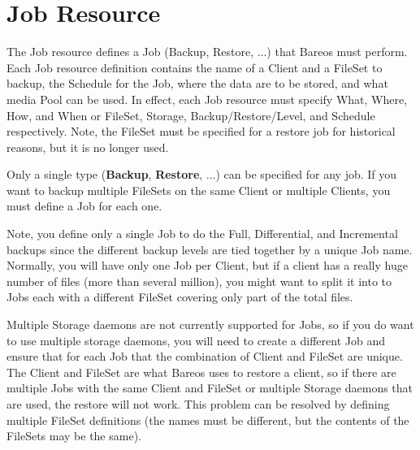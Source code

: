 \section{Job Resource}
\label{JobResource}

The Job resource defines a Job (Backup, Restore, ...) that Bareos must
perform. Each Job resource definition contains the name of a Client and
a FileSet to backup, the Schedule for the Job, where the data
are to be stored, and what media Pool can be used. In effect, each Job
resource must specify What, Where, How, and When or FileSet, Storage,
Backup/Restore/Level, and Schedule respectively. Note, the FileSet must
be specified for a restore job for historical reasons, but it is no longer used.

Only a single type ({\bf Backup}, {\bf Restore}, ...) can be specified for any
job. If you want to backup multiple FileSets on the same Client or multiple
Clients, you must define a Job for each one.

Note, you define only a single Job to do the Full, Differential, and
Incremental backups since the different backup levels are tied together by
a unique Job name.  Normally, you will have only one Job per Client, but
if a client has a really huge number of files (more than several million),
you might want to split it into to Jobs each with a different FileSet
covering only part of the total files.

Multiple Storage daemons are not currently supported for Jobs, so if
you do want to use multiple storage daemons, you will need to create
a different Job and ensure that for each Job that the combination of
Client and FileSet are unique.  The Client and FileSet are what Bareos
uses to restore a client, so if there are multiple Jobs with the same
Client and FileSet or multiple Storage daemons that are used, the
restore will not work.  This problem can be resolved by defining multiple
FileSet definitions (the names must be different, but the contents of
the FileSets may be the same).



